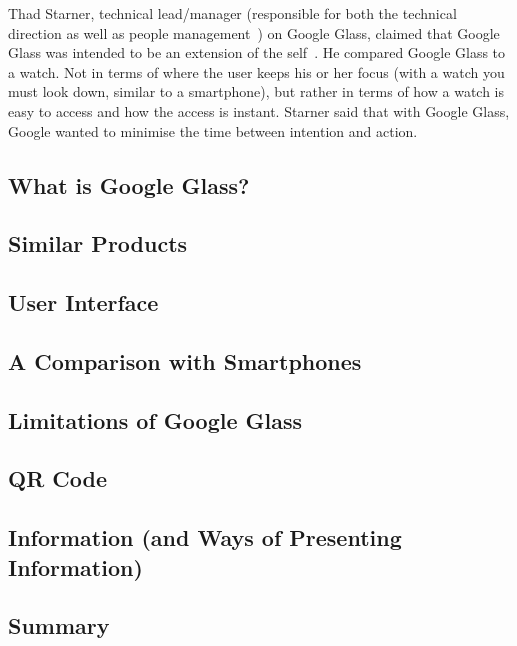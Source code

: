 Thad Starner, technical lead/manager (responsible for both the technical direction as well as people management~\cite{techLeadManager}) on Google Glass, claimed that Google Glass was intended to be an extension of the self~\cite{6504855}. He compared Google Glass to a watch. Not in terms of where the user keeps his or her focus (with a watch you must look down, similar to a smartphone), but rather in terms of how a watch is easy to access and how the access is instant. Starner said that with Google Glass, Google wanted to minimise the time between intention and action. 
%
\subsection{What is Google Glass?}
\label{subsec:googleglass}

%
\subsection{Similar Products}
\label{subsec:similarproducts}

%
\subsection{User Interface}
\label{subsec:userinterface}

%
\subsection{A Comparison with Smartphones}
\label{comparedtophones}

%
\subsection{Limitations of Google Glass}
\label{subsec:limitations}

%
\subsection{QR Code}
\label{subsec:qrcode}

%
\subsection{Information (and Ways of Presenting Information)}
\label{subsec:information}

%
\subsection{Summary}
\label{subsec:summary}

%
